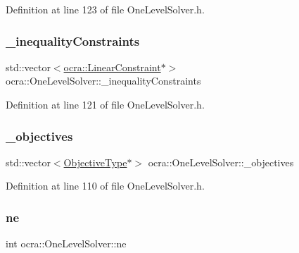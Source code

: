 Definition at line 123 of file One\+Level\+Solver.\+h.

\hypertarget{classocra_1_1OneLevelSolver_a87161154a54c64ac44ec3a9cb2d9a6ec}{}\label{classocra_1_1OneLevelSolver_a87161154a54c64ac44ec3a9cb2d9a6ec} 
\subsubsection{\texorpdfstring{\+\_\+inequality\+Constraints}{\_inequalityConstraints}}
{\footnotesize\ttfamily std\+::vector$<$\hyperlink{namespaceocra_ae8b87cf4099be3efc3b410019ad2046e}{ocra\+::\+Linear\+Constraint}$\ast$$>$ ocra\+::\+One\+Level\+Solver\+::\+\_\+inequality\+Constraints\hspace{0.3cm}{\ttfamily [protected]}}



Definition at line 121 of file One\+Level\+Solver.\+h.

\hypertarget{classocra_1_1OneLevelSolver_aa1b1b5c203c50e16fc9c8ff8256d8d6c}{}\label{classocra_1_1OneLevelSolver_aa1b1b5c203c50e16fc9c8ff8256d8d6c} 
\subsubsection{\texorpdfstring{\+\_\+objectives}{\_objectives}}
{\footnotesize\ttfamily std\+::vector$<$\hyperlink{classocra_1_1OneLevelSolver_a93b0be052a859bbd4c81584aa1646ffb}{Objective\+Type}$\ast$$>$ ocra\+::\+One\+Level\+Solver\+::\+\_\+objectives\hspace{0.3cm}{\ttfamily [protected]}}



Definition at line 110 of file One\+Level\+Solver.\+h.

\hypertarget{classocra_1_1OneLevelSolver_aeb834ab417c238bca2003c630703dbf8}{}\label{classocra_1_1OneLevelSolver_aeb834ab417c238bca2003c630703dbf8} 
\subsubsection{\texorpdfstring{ne}{ne}}
{\footnotesize\ttfamily int ocra\+::\+One\+Level\+Solver\+::ne\hspace{0.3cm}{\ttfamily [protected]}}



